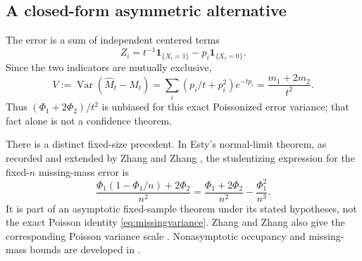 \documentclass[11pt]{article}
\numberwithin{equation}{section}
\theoremstyle{definition}
\theoremstyle{remark}
\newcommand{\ind}{\mathbf1}
\newcommand{\Var}{\operatorname{Var}}
\begin{document}
\subsection{A closed-form asymmetric alternative}\label{subsec:bernstein}
The error is a sum of independent centered terms
\[
 Z_i=t^{-1}\ind_{\{X_i=1\}}-p_i\ind_{\{X_i=0\}}.
\]
Since the two indicators are mutually exclusive,
\begin{equation}\label{eq:missingvariance}
 V:=\Var(\widehat M_t-M_t)
 =\sum_i(p_i/t+p_i^2)e^{-tp_i}
 =\frac{m_1+2m_2}{t^2}.
\end{equation}
Thus $(\Phi_1+2\Phi_2)/t^2$ is unbiased for this exact Poissonized error variance; that fact alone is not a confidence theorem.

There is a distinct fixed-size precedent. In Esty's normal-limit theorem, as recorded and extended by Zhang and Zhang \cite{Esty1983,ZhangZhang2009}, the studentizing expression for the fixed-$n$ missing-mass error is
\begin{equation}\label{eq:estyvariance}
 \frac{\Phi_1(1-\Phi_1/n)+2\Phi_2}{n^2}
 =\frac{\Phi_1+2\Phi_2}{n^2}-\frac{\Phi_1^2}{n^3}.
\end{equation}
It is part of an asymptotic fixed-sample theorem under its stated hypotheses, not the exact Poisson identity \eqref{eq:missingvariance}. Zhang and Zhang also give the corresponding Poisson variance scale \cite[Section 2]{ZhangZhang2009}. Nonasymptotic occupancy and missing-mass bounds are developed in \cite{BenHamou2017}.
\end{document}
